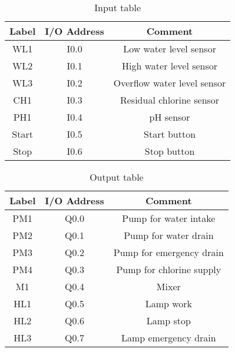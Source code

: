 \begin{table}[]
    \centering
    \begin{tabular}{|c|c|c|}
    \hline
       Label & I/O Address & Comment \\
       \hline
       WL1 & I0.0 & Low water level sensor\\
       \hline
       WL2 & I0.1 & High water level sensor\\
       \hline
       WL3 & I0.2 & Overflow water level sensor\\
       \hline
       CH1 & I0.3 & Residual chlorine sensor\\
       \hline
       PH1 & I0.4 & pH sensor\\
       \hline
       Start & I0.5 & Start button\\
       \hline
       Stop & I0.6 & Stop button\\
       \hline
    \end{tabular}
    \caption{Input table}
    \label{tab:my_label}
\end{table}

\begin{table}[]
    \centering
    \begin{tabular}{|c|c|c|}
    \hline
       Label & I/O Address & Comment \\
       \hline
       PM1 & Q0.0 & Pump for water intake\\
       \hline
       PM2 & Q0.1 & Pump for water drain\\
       \hline
       PM3 & Q0.2 & Pump for emergency drain\\
       \hline
       PM4 & Q0.3 & Pump for chlorine supply\\
       \hline
       M1 & Q0.4 & Mixer\\
       \hline
       HL1 & Q0.5 & Lamp work\\
       \hline
       HL2 & Q0.6 & Lamp stop\\
       \hline
       HL3 & Q0.7 & Lamp emergency drain\\
       \hline
    \end{tabular}
    \caption{Output table}
    \label{tab:my_label}
\end{table}

